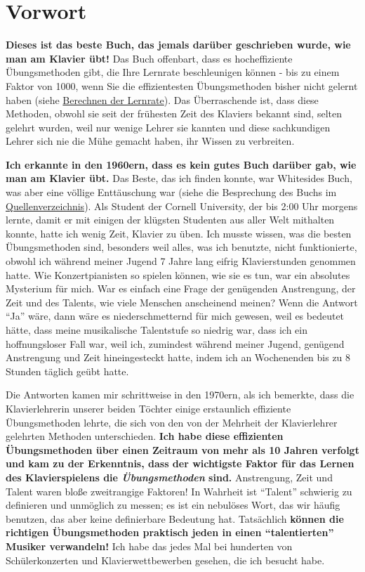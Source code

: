 
\section*{Vorwort}
\label{preface}


\textbf{Dieses ist das beste Buch, das jemals darüber geschrieben wurde, wie man am Klavier übt!}
Das Buch offenbart, dass es hocheffiziente Übungsmethoden gibt, die Ihre Lernrate beschleunigen können - bis zu einem Faktor von 1000, wenn Sie die effizientesten Übungsmethoden bisher nicht gelernt haben (siehe \hyperref[c1iv5]{Berechnen der Lernrate}).
Das Überraschende ist, dass diese Methoden, obwohl sie seit der frühesten Zeit des Klaviers bekannt sind, selten gelehrt wurden, weil nur wenige Lehrer sie kannten und diese sachkundigen Lehrer sich nie die Mühe gemacht haben, ihr Wissen zu verbreiten.

\textbf{Ich erkannte in den 1960ern, dass es kein gutes Buch darüber gab, wie man am Klavier übt.}
Das Beste, das ich finden konnte, war Whitesides Buch, was aber eine völlige Enttäuschung war (siehe die Besprechung des Buchs im \hyperref[Whiteside]{Quellenverzeichnis}).
Als Student der Cornell University, der bis 2:00 Uhr morgens lernte, damit er mit einigen der klügsten Studenten aus aller Welt mithalten konnte, hatte ich wenig Zeit, Klavier zu üben.
Ich musste wissen, was die besten Übungsmethoden sind, besonders weil alles, was ich benutzte, nicht funktionierte, obwohl ich während meiner Jugend 7 Jahre lang eifrig Klavierstunden genommen hatte.
Wie Konzertpianisten so spielen können, wie sie es tun, war ein absolutes Mysterium für mich.
War es einfach eine Frage der genügenden Anstrengung, der Zeit und des Talents, wie viele Menschen anscheinend meinen?
Wenn die Antwort \enquote{Ja} wäre, dann wäre es niederschmetternd für mich gewesen, weil es bedeutet hätte, dass meine musikalische Talentstufe so niedrig war, dass ich ein hoffnungsloser Fall war, weil ich, zumindest während meiner Jugend, genügend Anstrengung und Zeit hineingesteckt hatte, indem ich an Wochenenden bis zu 8 Stunden täglich geübt hatte.

Die Antworten kamen mir schrittweise in den 1970ern, als ich bemerkte, dass die Klavierlehrerin unserer beiden Töchter einige erstaunlich effiziente Übungsmethoden lehrte, die sich von den von der Mehrheit der Klavierlehrer gelehrten Methoden unterschieden.
\textbf{Ich habe diese effizienten Übungsmethoden über einen Zeitraum von mehr als 10 Jahren verfolgt und kam zu der Erkenntnis, dass der wichtigste Faktor für das Lernen des Klavierspielens die \textit{Übungsmethoden} sind.}
Anstrengung, Zeit und Talent waren bloße zweitrangige Faktoren!
In Wahrheit ist \enquote{Talent} schwierig zu definieren und unmöglich zu messen; es ist ein nebulöses Wort, das wir häufig benutzen, das aber keine definierbare Bedeutung hat.
Tatsächlich \textbf{können die richtigen Übungsmethoden praktisch jeden in einen \enquote{talentierten} Musiker verwandeln!}
Ich habe das jedes Mal bei hunderten von Schülerkonzerten und Klavierwettbewerben gesehen, die ich besucht habe.

